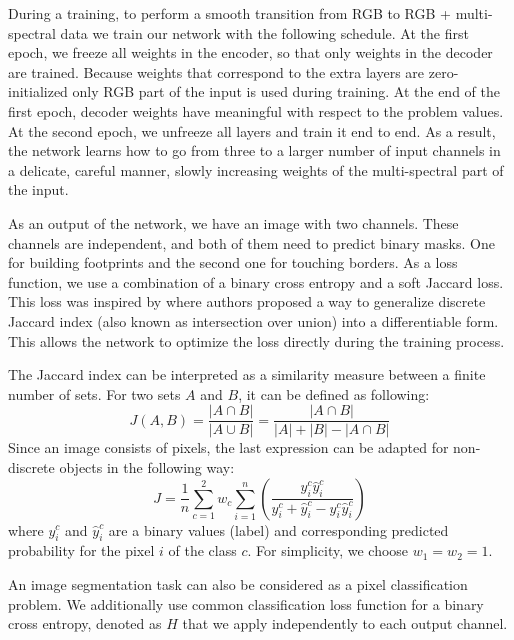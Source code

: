\documentclass[10pt,twocolumn,letterpaper]{article}
\begin{document}
During a training, to perform a smooth transition from RGB to RGB + multi-spectral data we train our network with the following schedule. At the first epoch, we freeze all weights in the encoder, so that only weights in the decoder are trained. Because weights that correspond to the extra layers are zero-initialized only RGB part of the input is used during training. At the end of the first epoch, decoder weights have meaningful with respect to the problem values. At the second epoch, we unfreeze all layers and train it end to end. As a result, the network learns how to go from three to a larger number of input channels in a delicate, careful manner, slowly increasing weights of the multi-spectral part of the input.

As an output of the network, we have an image with two channels. These channels are independent, and both of them need to predict binary masks. One for building footprints and the second one for touching borders. As a loss function, we use a combination of a binary cross entropy and a soft Jaccard loss. This loss was inspired by \cite{iglovikov2017satellite} where authors proposed a way to generalize discrete Jaccard index (also known as intersection over union) into a differentiable form. This allows the network to optimize the loss directly during the training process. 

The Jaccard index can be interpreted as a similarity measure between a finite number of sets. For two sets $A$ and $B$, it can be defined as following:
\begin{equation}
\label{jaccard_iou}
    J(A, B) = \frac{|A\cap B|}{|A\cup B|} = \frac{|A\cap B|}{|A|+|B|-|A\cap B|}
\end{equation}
Since an image consists of pixels, the last expression can be adapted for non-discrete objects in the following way:
\begin{equation}
\label{dicrjacc}
J=\frac{1}{n}\sum_{c=1}^2w_c\sum\limits_{i=1}^n\left(\frac{y_i^c\hat{y}^c_i}{y_{i}^c+\hat{y}^c_i-y_i^c\hat{y}_i^c}\right)
\end{equation}
where $y_i^c$ and $\hat{y}_i^c$ are a binary values (label) and corresponding predicted probability for the pixel $i$ of the class $c$. For simplicity, we choose $w_1 = w_2 = 1$. 

An image segmentation task can also be considered as a pixel classification problem. We additionally use common classification loss function for a binary cross entropy, denoted as $H$ that we apply independently to each output channel.
\end{document}
